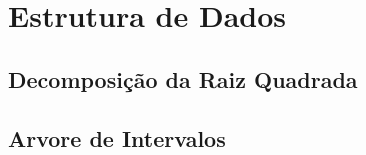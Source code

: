 \section{Estrutura de Dados}
\subsection{Decomposição da Raiz Quadrada}
\subsection{Arvore de Intervalos}
\newpage